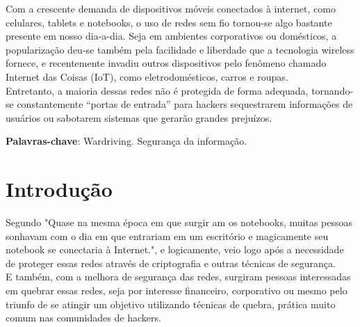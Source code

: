 \documentclass[
	article,			%
	12pt,				%
	oneside,			%
	a4paper,			%
	english,			%
	brazil,				%
	sumario=tradicional
	]{abntex2}
\begin{document}

\frenchspacing

\maketitle

\begin{resumoumacoluna}
Com a crescente demanda de dispositivos móveis conectados à internet, como celulares, tablets e notebooks, o uso de redes sem fio tornou-se algo bastante presente em nosso dia-a-dia. Seja em ambientes corporativos ou domésticos, a popularização deu-se também pela facilidade e liberdade que a tecnologia wireless fornece, e recentemente invadiu outros dispositivos pelo fenômeno chamado Internet das Coisas (IoT), como eletrodomésticos, carros e roupas.\\

Entretanto, a maioria dessas redes não é protegida de forma adequada, tornando-se constantemente “portas de entrada” para hackers sequestrarem informações de usuários ou sabotarem sistemas que gerarão grandes prejuízos.\\

 \vspace{\onelineskip}

 \noindent
 \textbf{Palavras-chave}: Wardriving. Segurança da informação.
\end{resumoumacoluna}

\textual

\section*{Introdução}
\nocite{varredura-ibirama}
\nocite{analise-vulnerabilidade}

Segundo \cite[p. 67]{redes-tanenbaum} "Quase na mesma época em que surgir am os notebooks, muitas pessoas sonhavam com o dia em que entrariam em um escritório e magicamente seu notebook se conectaria à Internet.", e logicamente, veio logo após a necessidade de proteger essas redes através de criptografia e outras técnicas de segurança.\\

E também, com a melhora de segurança das redes, surgiram pessoas interessadas em quebrar essas redes, seja por interesse financeiro, corporativo ou mesmo pelo triunfo de se atingir um objetivo utilizando técnicas de quebra, prática muito comum nas comunidades de hackers.
\end{document}
